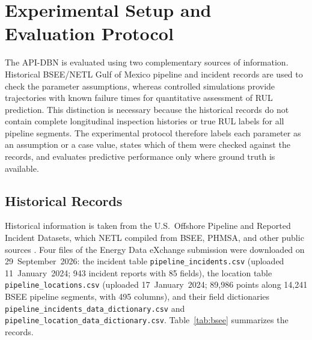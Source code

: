 \documentclass[journal]{IEEEtran}
\begin{document}
\section{Experimental Setup and Evaluation Protocol}
\label{sec:evalsetup}

The API-DBN is evaluated using two complementary sources of
information. Historical BSEE/NETL Gulf of Mexico pipeline and incident
records are used to check the parameter assumptions, whereas
controlled simulations provide
trajectories with known failure times for quantitative assessment of
RUL prediction.
This distinction is necessary because the historical records do not
contain complete longitudinal inspection histories or true RUL labels
for all pipeline segments. The experimental protocol therefore labels
each parameter as an assumption or a case value, states which of them
were checked against the records, and evaluates predictive performance
only where ground truth is available.



\subsection{Historical Records}
\label{sec:data}

Historical information is taken from the U.S.\ Offshore Pipeline and
Reported Incident Datasets, which NETL compiled from BSEE, PHMSA, and
other public sources \cite{romeo2024,pfander2024}. Four files of the
Energy Data eXchange submission were downloaded on 29~September~2026:
the incident table \texttt{pipeline\_incidents.csv} (uploaded
11~January~2024; 943 incident reports with 85 fields), the
location table \texttt{pipeline\_locations.csv} (uploaded
17~January~2024; 89{,}986 points along 14{,}241 BSEE pipeline
segments, with 495 columns), and their field dictionaries
\texttt{pipeline\_incidents\_data\_dictionary.csv} and
\texttt{pipeline\_location\_data\_dictionary.csv}.
Table~\ref{tab:bsee} summarizes the records.
\end{document}
